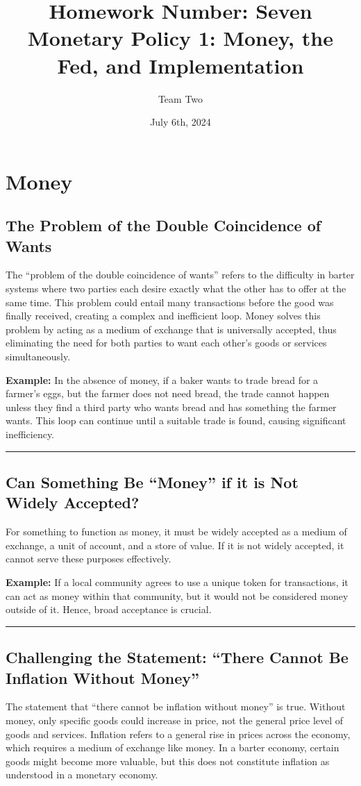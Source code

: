 \documentclass{article}
\title{Homework Number: Seven\\ \large Monetary Policy 1: Money, the Fed, and Implementation}
\author{Team Two}
\date{July 6th, 2024}
\begin{document}
\maketitle

\section{Money}

\subsection{The Problem of the Double Coincidence of Wants}
The ``problem of the double coincidence of wants'' refers to the difficulty in barter systems where two parties each desire exactly what the other has to offer at the same time. This problem could entail many transactions before the good was finally received, creating a complex and inefficient loop. Money solves this problem by acting as a medium of exchange that is universally accepted, thus eliminating the need for both parties to want each other's goods or services simultaneously. 

\textbf{Example:} In the absence of money, if a baker wants to trade bread for a farmer's eggs, but the farmer does not need bread, the trade cannot happen unless they find a third party who wants bread and has something the farmer wants. This loop can continue until a suitable trade is found, causing significant inefficiency.

\noindent\rule{\linewidth}{0.5pt}

\subsection{Can Something Be ``Money'' if it is Not Widely Accepted?}
For something to function as money, it must be widely accepted as a medium of exchange, a unit of account, and a store of value. If it is not widely accepted, it cannot serve these purposes effectively. 

\textbf{Example:} If a local community agrees to use a unique token for transactions, it can act as money within that community, but it would not be considered money outside of it. Hence, broad acceptance is crucial.

\noindent\rule{\linewidth}{0.5pt}

\subsection{Challenging the Statement: ``There Cannot Be Inflation Without Money''}
The statement that ``there cannot be inflation without money'' is true. Without money, only specific goods could increase in price, not the general price level of goods and services. Inflation refers to a general rise in prices across the economy, which requires a medium of exchange like money. In a barter economy, certain goods might become more valuable, but this does not constitute inflation as understood in a monetary economy.
\end{document}
